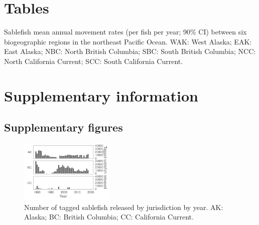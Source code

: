 \documentclass{article}
\begin{document}
\section{Tables}


\begin{table}[h]
  \begin{center}
  \caption{Sablefish mean annual movement rates (per fish per year; 90\%{} CI) between six biogeographic regions in the northeast Pacific Ocean. WAK: West Alaska; EAK: East Alaska; NBC: North British Columbia; SBC: South British Columbia; NCC: North California Current; SCC: South California Current.}
  \label{tab:movement-rate-regions-6-mean}
  \end{center}
\end{table}

\section{Supplementary information}

\subsection{Supplementary figures}

\begin{figure}[htb]
    \centering
    \includegraphics[width = 0.4\textwidth]{bar-regions-3-released-by-year}
    \caption{Number of tagged sablefish released by jurisdiction by year. AK: Alaska; BC: British Columbia; CC: California Current.}
    \label{fig:bar-regions-3-released-by-year}
\end{figure}
\end{document}
